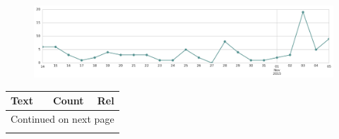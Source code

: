 \begin{figure}[htbp!]
    \centering
    \includegraphics[width=\textwidth]{twitter_all/report_images/topic-20-timeseries.jpg}
\end{figure}

\begin{longtable}{p{12.5cm}rr}
\toprule
Text & Count & Rel \\
\midrule
\endhead
\midrule
\multicolumn{3}{r}{{Continued on next page}} \\
\midrule
\endfoot


\end{longtable}
